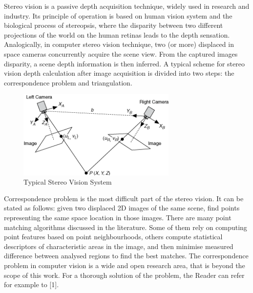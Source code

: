 Stereo vision is a passive depth acquisition technique, widely used in research and  industry. Its principle of operation is based on human vision system and the biological process of stereopsis, where the disparity between two different projections of the world on the human retinas leads to the depth sensation. Analogically, in computer stereo vision technique, two (or more) displaced in space cameras concurrently acquire the scene view. From the captured images disparity, a scene depth information is then inferred. A typical scheme for stereo vision depth calculation after image acquisition is divided into two steps: the correspondence problem and triangulation.

\begin{figure}[H]
\label{fig:stereo}
\centering
\includegraphics[width=0.7\textwidth]{fig/stereovision}
\caption{Typical Stereo Vision System}
\end{figure}

Correspondence problem is the most difficult part of the stereo vision. It can be stated as follows: given two displaced 2D images of the same scene, find points representing the same space location in those images. There are many point matching algorithms discussed in the literature. Some of them rely on computing point features based on point neighbourhoods, others compute statistical descriptors of characteristic areas in the image, and then minimise measured difference between analysed regions to find the best matches. The correspondence problem in computer vision is a wide and open research area, that is beyond the scope of this work. For a thorough solution of the problem, the Reader can refer for example to [1].

